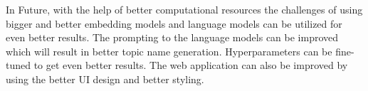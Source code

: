 In Future, with the help of better computational resources the challenges of using bigger and better embedding models and language models can be utilized
for even better results. The prompting to the language models can be improved which will result in better topic name generation.
Hyperparameters can be fine-tuned to get even better results. The web application can also be improved by using the better UI design and better styling.


